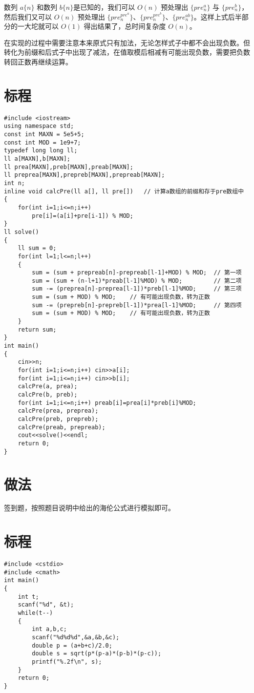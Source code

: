 \documentclass{ctsol}
\begin{document}
数列 $a\{n\}$ 和数列 $b\{n\}$是已知的，我们可以 $O(n)$ 预处理出 $\{pre^a_n\}$ 与 $\{pre^b_n\}$，然后我们又可以 $O(n)$ 预处理出 $\{pre^{pre^a}_n\}$、$\{pre^{pre^b}_n\}$、$\{pre^{ab}_n\}$。这样上式后半部分的一大坨就可以 $O(1)$ 得出结果了，总时间复杂度 $O(n)$。

在实现的过程中需要注意本来原式只有加法，无论怎样式子中都不会出现负数。但转化为前缀和后式子中出现了减法，在值取模后相减有可能出现负数，需要把负数转回正数再继续运算。

\section*{标程}
\begin{lstlisting}
#include <iostream>
using namespace std;
const int MAXN = 5e5+5;
const int MOD = 1e9+7;
typedef long long ll;
ll a[MAXN],b[MAXN];
ll prea[MAXN],preb[MAXN],preab[MAXN];
ll preprea[MAXN],prepreb[MAXN],prepreab[MAXN];
int n;
inline void calcPre(ll a[], ll pre[])   // 计算a数组的前缀和存于pre数组中
{
    for(int i=1;i<=n;i++)
        pre[i]=(a[i]+pre[i-1]) % MOD;
}
ll solve()
{
    ll sum = 0;
    for(int l=1;l<=n;l++)
    {
        sum = (sum + prepreab[n]-prepreab[l-1]+MOD) % MOD;  // 第一项
        sum = (sum + (n-l+1)*preab[l-1]%MOD) % MOD;         // 第二项
        sum -= (preprea[n]-preprea[l-1])*preb[l-1]%MOD;     // 第三项
        sum = (sum + MOD) % MOD;    // 有可能出现负数，转为正数
        sum -= (prepreb[n]-prepreb[l-1])*prea[l-1]%MOD;     // 第四项
        sum = (sum + MOD) % MOD;    // 有可能出现负数，转为正数
    }
    return sum;
}
int main()
{
    cin>>n;
    for(int i=1;i<=n;i++) cin>>a[i];
    for(int i=1;i<=n;i++) cin>>b[i];
    calcPre(a, prea);
    calcPre(b, preb);
    for(int i=1;i<=n;i++) preab[i]=prea[i]*preb[i]%MOD;
    calcPre(prea, preprea);
    calcPre(preb, prepreb);
    calcPre(preab, prepreab);
    cout<<solve()<<endl;
    return 0;
}
\end{lstlisting}

\makesolution
\section*{做法}
签到题，按照题目说明中给出的海伦公式进行模拟即可。

\section*{标程}
\begin{lstlisting}
#include <cstdio>
#include <cmath>
int main()
{
    int t;
    scanf("%d", &t);
    while(t--)
    {
        int a,b,c;
        scanf("%d%d%d",&a,&b,&c);
        double p = (a+b+c)/2.0;
        double s = sqrt(p*(p-a)*(p-b)*(p-c));
        printf("%.2f\n", s);
    }
    return 0;
}
\end{lstlisting}
\end{document}

